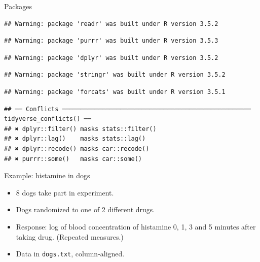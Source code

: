 \documentclass[ignorenonframetext,]{beamer}
\begin{document}
\begin{frame}[fragile]{Packages}
\begin{verbatim}
## Warning: package 'readr' was built under R version 3.5.2
\end{verbatim}

\begin{verbatim}
## Warning: package 'purrr' was built under R version 3.5.3
\end{verbatim}

\begin{verbatim}
## Warning: package 'dplyr' was built under R version 3.5.2
\end{verbatim}

\begin{verbatim}
## Warning: package 'stringr' was built under R version 3.5.2
\end{verbatim}

\begin{verbatim}
## Warning: package 'forcats' was built under R version 3.5.1
\end{verbatim}

\begin{verbatim}
## ── Conflicts ──────────────────────────────────────────────────── tidyverse_conflicts() ──
## ✖ dplyr::filter() masks stats::filter()
## ✖ dplyr::lag()    masks stats::lag()
## ✖ dplyr::recode() masks car::recode()
## ✖ purrr::some()   masks car::some()
\end{verbatim}

\end{frame}

\begin{frame}[fragile]{Example: histamine in dogs}
\protect\hypertarget{example-histamine-in-dogs}{}

\begin{itemize}
\item
  8 dogs take part in experiment.
\item
  Dogs randomized to one of 2 different drugs.
\item
  Response: log of blood concentration of histamine 0, 1, 3 and 5
  minutes after taking drug. (Repeated measures.)
\item
  Data in \texttt{dogs.txt}, column-aligned.
\end{itemize}

\end{frame}
\end{document}
